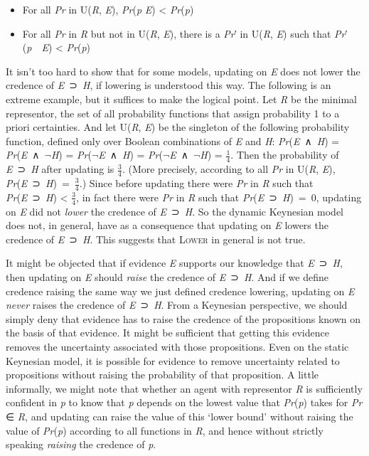 \documentclass[
  10pt,
  letterpaper,
  DIV=11,
  numbers=noendperiod,
  twoside]{scrartcl}
\providecommand{\tightlist}{%
  \setlength{\itemsep}{0pt}\setlength{\parskip}{0pt}}\usepackage{longtable,booktabs,array}
\begin{document}
\begin{itemize}
\tightlist
\item
  For all \emph{Pr} in U(\emph{R}, \emph{E}), \emph{Pr}(\emph{p}
  \textbar{} \emph{E}) \textless{} \emph{Pr}(\emph{p})
\item
  For all \emph{Pr} in \emph{R} but not in U(\emph{R}, \emph{E}), there
  is a \emph{Pr}′ in U(\emph{R}, \emph{E}) such that
  \emph{Pr}′(\emph{p}~~\emph{E}) \textless{} \emph{Pr}(\emph{p})
\end{itemize}

It isn't too hard to show that for some models, updating on \emph{E}
does not lower the credence of \emph{E}~⊃~\emph{H}, if lowering is
understood this way. The following is an extreme example, but it
suffices to make the logical point. Let \emph{R} be the minimal
representor, the set of all probability functions that assign
probability 1 to a priori certainties. And let U(\emph{R}, \emph{E}) be
the singleton of the following probability function, defined only over
Boolean combinations of \emph{E} and \emph{H}:
\emph{Pr}(\emph{E}~∧~\emph{H}) =
\emph{Pr}(\emph{E}~∧~\({\lnot}\)\emph{H}) =
\emph{Pr}(\({\lnot}\)\emph{E}~∧~\emph{H}) =
\emph{Pr}(\({\lnot}\)\emph{E}~∧~\({\lnot}\)\emph{H}) = \(\frac{1}{4}\).
Then the probability of \emph{E}~⊃~\emph{H} after updating is
\(\frac{3}{4}\). (More precisely, according to all \emph{Pr} in
U(\emph{R}, \emph{E}),
\emph{Pr}(\emph{E}~⊃~\emph{H})~=~\(\frac{3}{4}\).) Since before updating
there were \emph{Pr} in \emph{R} such that
\emph{Pr}(\emph{E}~⊃~\emph{H}) \textless{} \(\frac{3}{4}\), in fact
there were \emph{Pr} in \emph{R} such that
\emph{Pr}(\emph{E}~⊃~\emph{H})~=~0, updating on \emph{E} did not
\emph{lower} the credence of \emph{E}~⊃~\emph{H}. So the dynamic
Keynesian model does not, in general, have as a consequence that
updating on \emph{E} lowers the credence of \emph{E}~⊃~\emph{H}. This
suggests that \textsc{Lower} in general is not true.

It might be objected that if evidence \emph{E} supports our knowledge
that \emph{E}~⊃~\emph{H}, then updating on \emph{E} should \emph{raise}
the credence of \emph{E}~⊃~\emph{H}. And if we define credence raising
the same way we just defined credence lowering, updating on \emph{E}
\emph{never} raises the credence of \emph{E}~⊃~\emph{H}. From a
Keynesian perspective, we should simply deny that evidence has to raise
the credence of the propositions known on the basis of that evidence. It
might be sufficient that getting this evidence removes the uncertainty
associated with those propositions. Even on the static Keynesian model,
it is possible for evidence to remove uncertainty related to
propositions without raising the probability of that proposition. A
little informally, we might note that whether an agent with representor
\emph{R} is sufficiently confident in \emph{p} to know that \emph{p}
depends on the lowest value that \emph{Pr}(\emph{p}) takes for \emph{Pr}
∈ \emph{R}, and updating can raise the value of this `lower bound'
without raising the value of \emph{Pr}(\emph{p}) according to all
functions in \emph{R}, and hence without strictly speaking
\emph{raising} the credence of \emph{p}.
\end{document}
